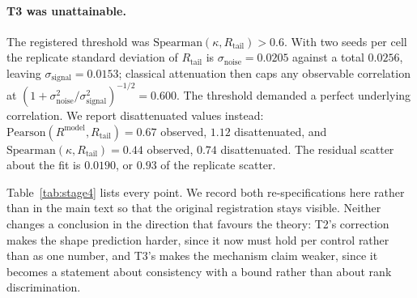 \documentclass[aps,pra,onecolumn,notitlepage,superscriptaddress,nofootinbib,floatfix]{revtex4-2}
\newcommand{\Rt}{R_{\mathrm{tail}}}
\newcommand{\Rm}{R^{\mathrm{model}}}
\begin{document}
\paragraph*{T3 was unattainable.} The registered threshold was
$\mathrm{Spearman}(\kappa,\Rt)>0.6$. With two seeds per cell the replicate
standard deviation of $\Rt$ is $\sigma_{\mathrm{noise}}=0.0205$ against a
total $0.0256$, leaving $\sigma_{\mathrm{signal}}=0.0153$; classical
attenuation then caps any observable correlation at
$(1+\sigma^2_{\mathrm{noise}}/\sigma^2_{\mathrm{signal}})^{-1/2}=0.600$. The
threshold demanded a perfect underlying correlation. We report disattenuated
values instead: $\mathrm{Pearson}(\Rm,\Rt)=0.67$ observed, $1.12$
disattenuated, and $\mathrm{Spearman}(\kappa,\Rt)=0.44$ observed, $0.74$
disattenuated. The residual scatter about the fit is $0.0190$, or $0.93$ of
the replicate scatter.

Table~\ref{tab:stage4} lists every point. We record both re-specifications
here rather than in the main text so that the original registration stays
visible. Neither changes a conclusion in the
direction that favours the theory: T2's correction makes the shape prediction
harder, since it now must hold per control rather than as one number, and
T3's makes the mechanism claim weaker, since it becomes a statement about
consistency with a bound rather than about rank discrimination.
\end{document}
